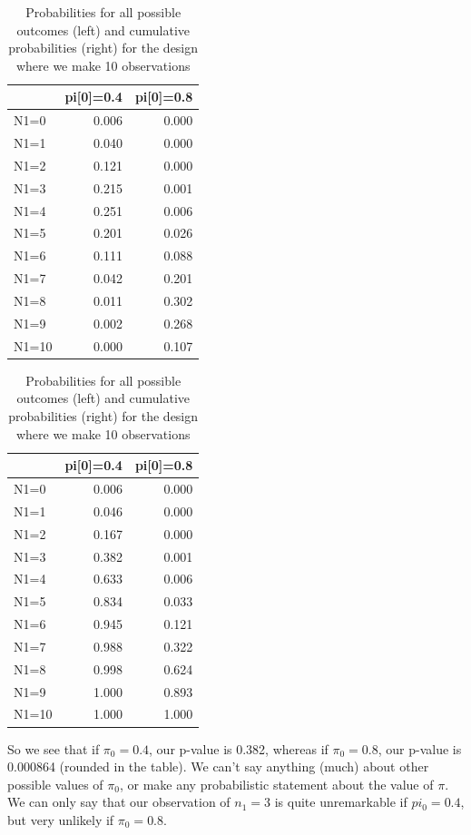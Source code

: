 \documentclass[
  openany]{book}
\theoremstyle{definition}
\theoremstyle{definition}
\theoremstyle{definition}
\theoremstyle{definition}
\theoremstyle{remark}
\begin{document}
\begin{table}
\caption{\label{tab:bin1}Probabilities for all possible outcomes (left) and cumulative probabilities (right) for the design where we make 10 observations}

\centering
\begin{tabular}[t]{lrr}
\toprule
  & pi[0]=0.4 & pi[0]=0.8\\
\midrule
N1=0 & 0.006 & 0.000\\
N1=1 & 0.040 & 0.000\\
N1=2 & 0.121 & 0.000\\
N1=3 & 0.215 & 0.001\\
N1=4 & 0.251 & 0.006\\
\addlinespace
N1=5 & 0.201 & 0.026\\
N1=6 & 0.111 & 0.088\\
N1=7 & 0.042 & 0.201\\
N1=8 & 0.011 & 0.302\\
N1=9 & 0.002 & 0.268\\
\addlinespace
N1=10 & 0.000 & 0.107\\
\bottomrule
\end{tabular}
\centering
\begin{tabular}[t]{lrr}
\toprule
  & pi[0]=0.4 & pi[0]=0.8\\
\midrule
N1=0 & 0.006 & 0.000\\
N1=1 & 0.046 & 0.000\\
N1=2 & 0.167 & 0.000\\
N1=3 & 0.382 & 0.001\\
N1=4 & 0.633 & 0.006\\
\addlinespace
N1=5 & 0.834 & 0.033\\
N1=6 & 0.945 & 0.121\\
N1=7 & 0.988 & 0.322\\
N1=8 & 0.998 & 0.624\\
N1=9 & 1.000 & 0.893\\
\addlinespace
N1=10 & 1.000 & 1.000\\
\bottomrule
\end{tabular}
\end{table}

So we see that if \(\pi_0=0.4\), our p-value is 0.382, whereas if \(\pi_0=0.8\), our p-value is 0.000864 (rounded in the table). We can't say anything (much) about other possible values of \(\pi_0\), or make any probabilistic statement about the value of \(\pi\). We can only say that our observation of \(n_1=3\) is quite unremarkable if \(pi_0=0.4\), but very unlikely if \(\pi_0=0.8\).
\end{document}
